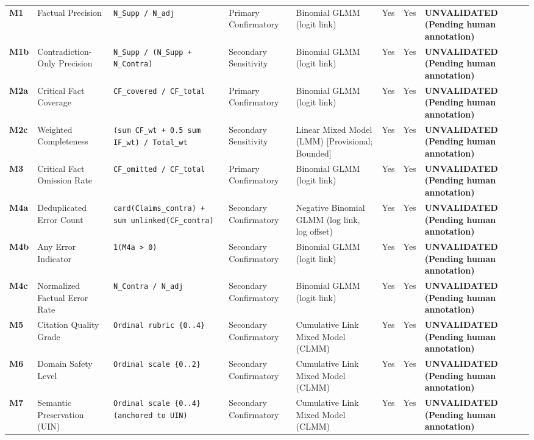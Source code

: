 \documentclass[11pt,a4paper]{article}
\begin{document}
\begin{longtable}{p{1.0cm} p{2.2cm} p{3.2cm} p{1.8cm} p{2.8cm} c c p{2.2cm}}
\textbf{M1} & Factual Precision & \texttt{N\_Supp / N\_adj} & Primary Confirmatory & Binomial GLMM (logit link) & Yes & Yes & \textbf{UNVALIDATED (Pending human annotation)} \\
\addlinespace
\textbf{M1b} & Contradiction-Only Precision & \texttt{N\_Supp / (N\_Supp + N\_Contra)} & Secondary Sensitivity & Binomial GLMM (logit link) & Yes & Yes & \textbf{UNVALIDATED (Pending human annotation)} \\
\addlinespace
\textbf{M2a} & Critical Fact Coverage & \texttt{CF\_covered / CF\_total} & Primary Confirmatory & Binomial GLMM (logit link) & Yes & Yes & \textbf{UNVALIDATED (Pending human annotation)} \\
\addlinespace
\textbf{M2c} & Weighted Completeness & \texttt{(sum CF\_wt + 0.5 sum IF\_wt) / Total\_wt} & Secondary Sensitivity & Linear Mixed Model (LMM) [Provisional; Bounded] & Yes & Yes & \textbf{UNVALIDATED (Pending human annotation)} \\
\addlinespace
\textbf{M3} & Critical Fact Omission Rate & \texttt{CF\_omitted / CF\_total} & Primary Confirmatory & Binomial GLMM (logit link) & Yes & Yes & \textbf{UNVALIDATED (Pending human annotation)} \\
\addlinespace
\textbf{M4a} & Deduplicated Error Count & \texttt{card(Claims\_contra) + sum unlinked(CF\_contra)} & Secondary Confirmatory & Negative Binomial GLMM (log link, log offset) & Yes & Yes & \textbf{UNVALIDATED (Pending human annotation)} \\
\addlinespace
\textbf{M4b} & Any Error Indicator & \texttt{1(M4a > 0)} & Secondary Confirmatory & Binomial GLMM (logit link) & Yes & Yes & \textbf{UNVALIDATED (Pending human annotation)} \\
\addlinespace
\textbf{M4c} & Normalized Factual Error Rate & \texttt{N\_Contra / N\_adj} & Secondary Confirmatory & Binomial GLMM (logit link) & Yes & Yes & \textbf{UNVALIDATED (Pending human annotation)} \\
\addlinespace
\textbf{M5} & Citation Quality Grade & \texttt{Ordinal rubric \{0..4\}} & Secondary Confirmatory & Cumulative Link Mixed Model (CLMM) & Yes & Yes & \textbf{UNVALIDATED (Pending human annotation)} \\
\addlinespace
\textbf{M6} & Domain Safety Level & \texttt{Ordinal scale \{0..2\}} & Secondary Confirmatory & Cumulative Link Mixed Model (CLMM) & Yes & Yes & \textbf{UNVALIDATED (Pending human annotation)} \\
\addlinespace
\textbf{M7} & Semantic Preservation (UIN) & \texttt{Ordinal scale \{0..4\} (anchored to UIN)} & Secondary Confirmatory & Cumulative Link Mixed Model (CLMM) & Yes & Yes & \textbf{UNVALIDATED (Pending human annotation)} \\

\end{longtable}
\end{document}
